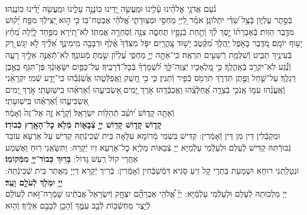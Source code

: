 \documentclass[twoside, openany, parskip=half, 11pt]{book}
\begin{document}
\label{vihi noam}
 \\
נֹ֨עַם אֲדֹנָ֥י אֱלֹהֵ֗ינוּ עָ֫לֵ֥ינוּ וּמַֽעֲשֵׂ֣ה יָ֭דֵינוּ כּֽוֹנֲנָ֣ה עָלֵ֑ינוּ וּמַֽעֲשֵׂ֥ה יָ֝דֵ֗ינוּ כּֽוֹנֲנֵֽהוּ׃\\
בְּֿסֵ֣תֶר עֶלְי֑וֹן בְּֿצֵ֥ל שַׁ֝דַּ֗י יִתְלוֹנָֽן׃
אֹמַ֗ר לַ֭יְיָ מַחְסִ֣י וּמְצֽוּדָתִ֑י אֱ֝לֹהַ֗י אֶבְטַח־בּֽוֹ׃
כִּ֤י ה֣וּא יַ֭צִּֽילְֿךָ מִפַּ֥ח יָ֝ק֗וּשׁ מִדֶּ֥בֶר הַוּֽוֹת׃
בְּֿאֶבְרָת֨וֹ יָ֣סֶךְ לָ֗ךְ וְֿתַ֣חַת כְּֿנָפָ֣יו תֶּחְסֶ֑ה צִנָּ֖ה וְֿסֹֽחֵרָ֣ה אֲמִתּֽוֹ׃
לֹֽא־תִ֭ירָא מִפַּ֣חַד לָ֑יְֿלָה מֵ֝חֵ֗ץ יָע֥וּף יוֹמָֽם׃
מִ֭דֶּֽבֶר בָּאֹ֣פֶל יַֽהֲלֹ֑ךְ מִ֝קֶּ֗טֶב יָשׁ֥וּד צָֽהֳרָֽיִם׃
יִפֹּ֤ל מִצִּדְּֿךָ֙ אֶ֗לֶף וּרְבָבָ֥ה מִֽימִינֶ֑ךָ אֵ֝לֶ֗יךָ לֹ֣א יִגָּֽשׁ׃
רַ֭ק בְּֿעֵינֶ֣יךָ תַבִּ֑יט וְֿשִׁלֻּמַ֖ת רְֿשָׁעִ֣ים תִּרְאֶֽה׃
כִּֽי־אַתָּ֣ה יְיָ֣ מַחְסִּ֑י עֶ֝לְי֗וֹן שַׂ֣מְתָּ מְֿעוֹנֶֽךָ׃
לֹֽא־תְֿֿאֻנֶּ֣ה אֵלֶ֣יךָ רָעָ֑ה וְֿנֶ֗֝גַע לֹֽא־יִקְרַ֥ב בְּֿאָֽהֳלֶֽךָ׃
כִּ֣י מַ֭לְאָכָיו יְֿצַוֶּה־לָּ֑ךְ לִ֝שְׁמָרְֿךָ֗ בְּֿכׇל־דְּֿֿרָכֶֽיךָ׃
עַל־כַּפַּ֥יִם יִשָּׂא֑וּנְֿךָ פֶּן־תִּגֹּ֖ף בָּאֶ֣בֶן רַגְלֶֽךָ׃
עַל־שַׁ֣חַל וָפֶ֣תֶן תִּדְרֹ֑ךְ תִּרְמֹ֖ס כְּֿפִ֣יר וְֿתַנִּֽין׃
כִּ֤י בִ֣י חָ֭שַׁק וַֽאֲפַלְּֿטֵ֑הוּ אֲשַׂ֝גְּֿבֵ֗הוּ כִּֽי־יָדַ֥ע שְֿׁמִֽי׃
יִקְרָאֵ֨נִי וְֽֿאֶֽעֱנֵ֗הוּ עִמּ֣וֹ אָֽנֹכִ֣י בְֿצָרָ֑ה אֲ֝חַלְּֿצֵֽ֗הוּ וַֽאֲכַבְּֿדֵֽהוּ׃
אֹ֣רֶךְ יָ֭מִים ֖אַשְׂבִּיעֵ֑הוּ וְֿ֝אַרְאֵ֗הוּ בִּֽישֽׁוּעָתִֽי׃
אֹ֣רֶךְ יָ֭מִים ֖אַשְׂבִּיעֵ֑הוּ וְֿ֝אַרְאֵ֗הוּ בִּֽישֽׁוּעָתִֽי׃\\
\label{v ata kadosh}
וְֿאַתָּ֥ה
%
קָד֑וֹשׁ י֝וֹשֵׁ֗ב תְּֿהִלּ֥וֹת יִשְׂרָאֵֽל׃
%
וְֿקָרָ֨א זֶ֤ה אֶל־זֶה֙ וְֿאָמַ֔ר׃\\
\textbf{קָד֧וֹשׁ קָד֛וֹשׁ קָד֖וֹשׁ יְיָ֣ צְֿבָא֑וֹת מְֿלֹ֥א כׇל־הָאָ֖רֶץ כְּֿבוֹדֽוֹ׃}\\
וּמְקַבְּֿלִין דֵּין מִן דֵּין וְֿאָמְֿרִין: קַדִּישׁ בִּשְׁמֵי מְֿרוֹמָא עִלָּאָה בֵּית שְֿׁכִינְֿתֵּהּ קַדִּישׁ עַל אַרְעָא עוֹבַד גְּֿבוּרְֿתֵּהּ קַדִּישׁ לְֿעָלַם וּלְעָלְֿמֵי עָלְֿמַיָּא יְיָ צְֿבָאוֹת מַלְיָא כׇל־אַרְעָא זִיו יְֿקָרֵהּ:  וַתִּשָּׂאֵֽנִי רֽוּחַ וָאֶשְׁמַע אַחֲרַי קוֹל רַֽעַשׁ גָּדוֹל:
\textbf{בָּר֥וּךְ כְּבוֹד־יְיָ֖ מִמְּֿקוֹמֽוֹ׃} \\
וּנְטָלַֽתְנִי רוּחָא וּשְׁמָעֵת בַּתְרַי קָל זִֽיעַ סַגִּיא דִּמְֿשַׁבְּֿחִין וְֿאָמְֿרִין: בְּֿרִיךְ יְֿקָרָא דַיְיָ מֵאֲתַר בֵּית שְֿׁכִינְֿתֵּהּ:
\textbf{יְיָ֥ יִמְלֹ֖ךְ לְֿעֹלָ֥ם וָעֶֽד׃} \\
יְיָ מַלְכוּתֵהּ לְֿעָלַם וּלְעַלְֿמֵי עָלְֿמְֿיָּא: יְיָ֗
%
אֱ֠לֹהֵי אַבְרָהָ֞ם יִצְחָ֤ק וְֿיִשְׂרָאֵל֙ אֲבֹתֵ֔ינוּ שָׁמְֿרָה־זֹּ֣את לְֿעוֹלָ֔ם לְֿיֵ֥צֶר מַחְשְֿׁב֖וֹת לְֿבַ֣ב עַמֶּ֑ךָ וְֿהָכֵ֥ן לְֿבָבָ֖ם אֵלֶֽיךָ׃ וְֿה֤וּא
\end{document}
